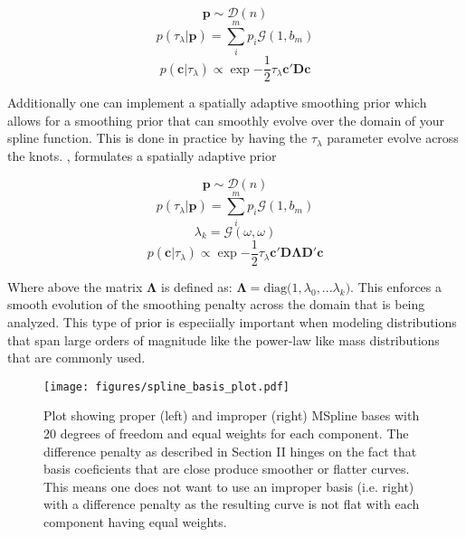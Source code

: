 \begin{equation}
    \bm{p} \sim \mathcal{D}(n)
\end{equation}
\begin{equation}
    p(\tau_\lambda | \bm{p}) = \sum_i^m p_i \mathcal{G}(1, b_m)
\end{equation}
\begin{equation}
    p(\bm{c} | \tau_\lambda) \propto \exp{-\frac{1}{2} \tau_\lambda \bm{c}' \bm{D} \bm{c}}
\end{equation}


Additionally one can implement a spatially adaptive smoothing prior which allows for a smoothing prior
that can smoothly evolve over the domain of your spline function. This is done in practice by having the $\tau_\lambda$ parameter evolve 
across the knots. , formulates a spatially adaptive prior 

\begin{equation}
    \bm{p} \sim \mathcal{D}(n)
\end{equation}
\begin{equation}
    p(\tau_\lambda | \bm{p}) = \sum_i^m p_i \mathcal{G}(1, b_m)
\end{equation}
\begin{equation}
    \lambda_k = \mathcal{G}(\omega, \omega)
\end{equation}
\begin{equation}
    p(\bm{c} | \tau_\lambda) \propto \exp{-\frac{1}{2} \tau_\lambda \bm{c}' \bm{D} \bm{\Lambda} \bm{D}' \bm{c}}
\end{equation}

Where above the matrix $\bm{\Lambda}$ is defined as: $\bm{\Lambda} = \mathrm{diag}\big(1,\lambda_0,...\lambda_k\big)$. This enforces a smooth evolution of the smoothing penalty 
across the domain that is being analyzed. This type of prior is especiially important when modeling distributions that span large orders of magnitude like 
the power-law like mass distributions that are commonly used. 


\begin{figure*}[ht!]
    \begin{centering}
        \texttt{[image: figures/spline\_basis\_plot.pdf]}
        \caption{Plot showing proper (left) and improper (right) MSpline bases with 20 degrees of freedom and equal weights for each component. The 
            difference penalty as described in Section II hinges on the fact that basis coeficients that are close produce smoother or flatter 
            curves. This means one does not want to use an improper basis (i.e. right) with a difference penalty as the resulting curve is not flat 
            with each component having equal weights.}
        \label{fig:spline_basis}
    \end{centering}
\end{figure*}

